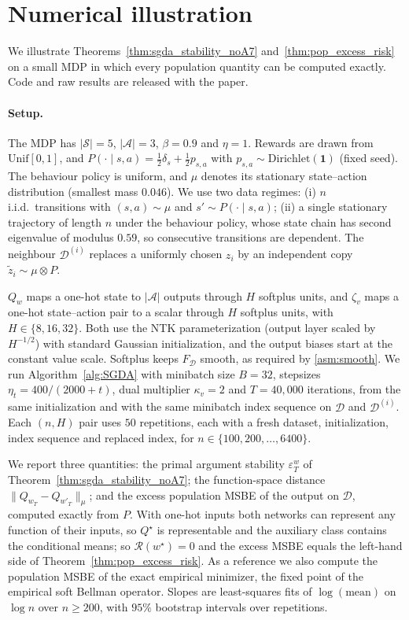 \section{Numerical illustration}\label{app:experiments}

We illustrate Theorems~\ref{thm:sgda_stability_noA7} and~\ref{thm:pop_excess_risk} on a small MDP in
which every population quantity can be computed exactly. Code and raw results are released with the paper.

\paragraph{Setup.}
The MDP has $|\mathcal S|=5$, $|\mathcal A|=3$, $\beta=0.9$ and $\eta=1$. Rewards are drawn from
$\mathrm{Unif}[0,1]$, and $P(\cdot\mid s,a)=\tfrac12\delta_s+\tfrac12 p_{s,a}$ with
$p_{s,a}\sim\mathrm{Dirichlet}(\mathbf 1)$ (fixed seed). The behaviour policy is uniform, and $\mu$
denotes its stationary state--action distribution (smallest mass $0.046$). We use two data regimes:
(i) $n$ i.i.d.\ transitions with $(s,a)\sim\mu$ and $s'\sim P(\cdot\mid s,a)$; (ii) a single stationary
trajectory of length $n$ under the behaviour policy, whose state chain has second eigenvalue of modulus
$0.59$, so consecutive transitions are dependent. The neighbour $\mathcal D^{(i)}$ replaces a uniformly
chosen $z_i$ by an independent copy $\tilde z_i\sim\mu\otimes P$.

$Q_w$ maps a one-hot state to $|\mathcal A|$ outputs through $H$ softplus units, and $\zeta_v$ maps a
one-hot state--action pair to a scalar through $H$ softplus units, with $H\in\{8,16,32\}$. Both use the
NTK parameterization (output layer scaled by $H^{-1/2}$) with standard Gaussian initialization, and the
output biases start at the constant value scale. Softplus keeps $F_{\mathcal D}$ smooth, as required by
\ref{asm:smooth}. We run Algorithm~\ref{alg:SGDA} with minibatch size $B=32$, stepsizes
$\eta_t=400/(2000+t)$, dual multiplier $\kappa_v=2$ and $T=40{,}000$ iterations, from the same
initialization and with the same minibatch index sequence on $\mathcal D$ and $\mathcal D^{(i)}$. Each
$(n,H)$ pair uses $50$ repetitions, each with a fresh dataset, initialization, index sequence and replaced
index, for $n\in\{100,200,\dots,6400\}$.

We report three quantities: the primal argument stability $\varepsilon^w_T$ of
Theorem~\ref{thm:sgda_stability_noA7}; the function-space distance
$\|Q_{w_T}-Q_{w'_T}\|_{\mu}$; and the excess population MSBE of the output on $\mathcal D$, computed
exactly from $P$. With one-hot inputs both networks can represent any function of their inputs, so
$Q^\star$ is representable and the auxiliary class contains the conditional means; so $\mathcal R(w^\star)=0$ and the excess MSBE equals the left-hand side of
Theorem~\ref{thm:pop_excess_risk}. As a reference we also compute the population MSBE of the exact
empirical minimizer, the fixed point of the empirical soft Bellman operator. Slopes are least-squares fits
of $\log(\text{mean})$ on $\log n$ over $n\ge 200$, with $95\%$ bootstrap intervals over repetitions.

